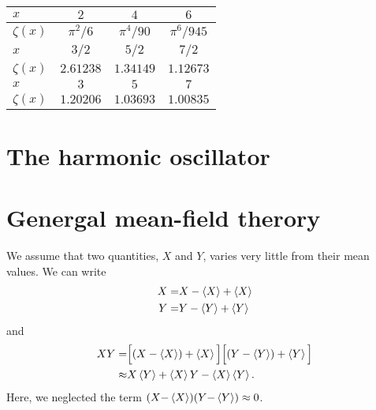 \documentclass[11pt,letter, swedish, english, twocolumn
]{article}
\begin{document}
\begin{center}
\begin{tabular}{|l||c|c|c|}\hline
$x$ & $2$ & $4$ & $6$
\\ \hline $\zeta(x)$ & 
$\pi^2/6$ & $\pi^4/90$ & $\pi^6/945$ 
\\ \hline\hline
$x$ & $3/2$ & $5/2$ & $7/2$
\\ \hline $\zeta(x)$ & 
$2.61238$ & $1.34149$ & $1.12673$ 
\\ \hline\hline
$x$ & $3$ & $5$ & $7$
\\ \hline$\zeta(x)$ & 
$1.20206$ & $1.03693$ & $1.00835$ 
\\ \hline
\end{tabular}
\end{center}



\section{The harmonic oscillator}



\section{Genergal mean-field therory}
We assume that two quantities, $X$ and $Y$, varies very little from
their mean values. We can write
\begin{equation}
\begin{aligned}
X=&X-\ev{X}+\ev{X}\\
Y=&Y-\ev{Y}+\ev{Y}
\end{aligned}
\end{equation}
and
\begin{equation}
\begin{aligned}
XY=&\Big[(X-\ev{X})+\ev{X}\Big]
\Big[(Y-\ev{Y})+\ev{Y}\Big]
\\\approx&
X\ev{Y}+\ev{X}Y-\ev{X}\ev{Y}.
\end{aligned}
\end{equation}
Here, we neglected the term $(X{-}\ev{X})(Y{-}\ev{Y})\approx0$. 
\end{document}
